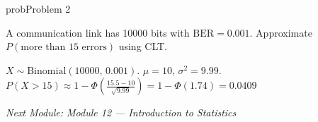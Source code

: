 \begin{PSbox}[unbreakable]{prob}{Problem 2}

A communication link has 10000 bits with $\mathrm{BER} = 0.001$. Approximate $P(\text{more than 15 errors})$ using CLT.

\PSsolution{} $X \sim \mathrm{Binomial}(10000,\, 0.001)$. $\mu = 10,\, \sigma^{2} = 9.99$.\PSbr{}$\displaystyle P(X > 15) \approx 1 - \Phi \left(\frac{15.5-10}{\sqrt{9.99}}\right) = 1 - \Phi (1.74) = 0.0409$

\end{PSbox}

\emph{Next Module: {Module 12 — Introduction to Statistics}}
